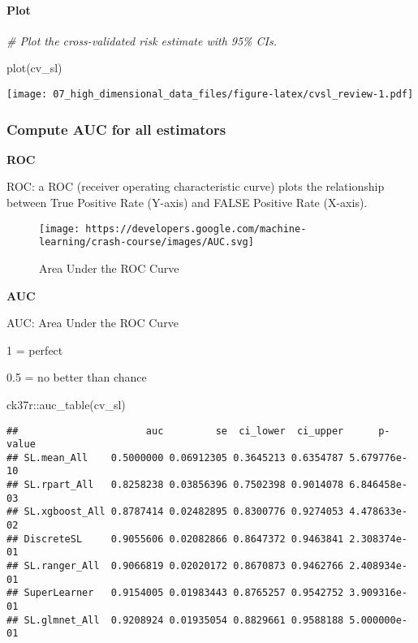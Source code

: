 \documentclass[
]{book}
\newenvironment{Shaded}{\begin{snugshade}}{\end{snugshade}}
\newcommand{\CommentTok}[1]{\textcolor[rgb]{0.56,0.35,0.01}{\textit{#1}}}
\newcommand{\FunctionTok}[1]{\textcolor[rgb]{0.00,0.00,0.00}{#1}}
\newcommand{\NormalTok}[1]{#1}
\newcommand{\SpecialCharTok}[1]{\textcolor[rgb]{0.00,0.00,0.00}{#1}}
\begin{document}
\hypertarget{plot}{%
\paragraph{Plot}\label{plot}}

\begin{Shaded}
\begin{Highlighting}[]
\CommentTok{\# Plot the cross{-}validated risk estimate with 95\% CIs.}

\FunctionTok{plot}\NormalTok{(cv\_sl)}
\end{Highlighting}
\end{Shaded}

\texttt{[image: 07\_high\_dimensional\_data\_files/figure-latex/cvsl\_review-1.pdf]}

\hypertarget{compute-auc-for-all-estimators}{%
\subsubsection{Compute AUC for all estimators}\label{compute-auc-for-all-estimators}}

\textbf{ROC}

ROC: a ROC (receiver operating characteristic curve) plots the relationship between True Positive Rate (Y-axis) and FALSE Positive Rate (X-axis).

\begin{figure}
\centering
\texttt{[image: https://developers.google.com/machine-learning/crash-course/images/AUC.svg]}
\caption{Area Under the ROC Curve}
\end{figure}

\textbf{AUC}

AUC: Area Under the ROC Curve

1 = perfect

0.5 = no better than chance

\begin{Shaded}
\begin{Highlighting}[]
\NormalTok{ck37r}\SpecialCharTok{::}\FunctionTok{auc\_table}\NormalTok{(cv\_sl)}
\end{Highlighting}
\end{Shaded}

\begin{verbatim}
##                      auc         se  ci_lower  ci_upper      p-value
## SL.mean_All    0.5000000 0.06912305 0.3645213 0.6354787 5.679776e-10
## SL.rpart_All   0.8258238 0.03856396 0.7502398 0.9014078 6.846458e-03
## SL.xgboost_All 0.8787414 0.02482895 0.8300776 0.9274053 4.478633e-02
## DiscreteSL     0.9055606 0.02082866 0.8647372 0.9463841 2.308374e-01
## SL.ranger_All  0.9066819 0.02020172 0.8670873 0.9462766 2.408934e-01
## SuperLearner   0.9154005 0.01983443 0.8765257 0.9542752 3.909316e-01
## SL.glmnet_All  0.9208924 0.01935054 0.8829661 0.9588188 5.000000e-01
\end{verbatim}
\end{document}
